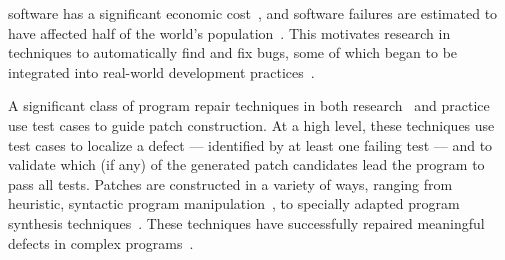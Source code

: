 \documentclass[10pt,journal,compsoc]{IEEEtran}
\begin{document}

 software has a significant economic cost~\cite{cambridge-study}, and
software failures are estimated to have affected half of the world's
population~\cite{tricentis}.  This motivates research in
techniques to automatically find and fix bugs, some of which
began to be integrated into
real-world development practices~\cite{iceland,sapfix,getafix}.

A significant class of program repair techniques in both
research~\cite{genprog,angelix,Le17,Xuan17,arja-journal,prapr,saha2019harnessing,astor}
and practice~\cite{sapfix} use test
cases to guide patch construction. At a high level, these techniques use test cases
to localize a defect --- identified by at least one failing test --- and to
validate which (if any) of the generated patch candidates lead
the program to pass all tests.
Patches are constructed in a variety of ways, ranging from heuristic, syntactic
program manipulation~\cite{par,genprog,rsrepair,ae,prophet,hdrepair,arja-journal,confix,saha2019harnessing},
to specially adapted program synthesis 
techniques~\cite{Konighofer11,Konighofer12,semfix,DeMarco14,angelix,sosrepair,Xuan17}. 
These techniques have successfully
repaired meaningful defects in complex
programs~\cite{angelix,genprog-eight-dollars,sapfix,durieux-repair-them-all}.
\end{document}
